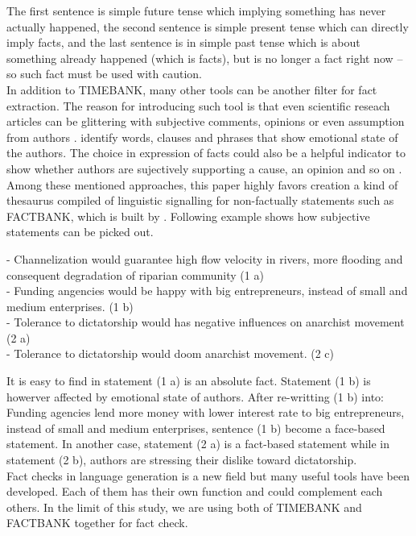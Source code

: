 The first sentence is simple future tense which implying something has never actually happened, the second sentence is simple present tense which can directly imply facts, and the last sentence is in simple past tense which is about something already happened (which is facts), but is no longer a fact right now -- so such fact must be used with caution. \\

In addition to TIMEBANK, many other tools can be another filter for fact extraction. The reason for introducing such tool is that even scientific reseach articles can be glittering with subjective comments, opinions or even assumption from authors \cite{schultze2000confessional}. \cite{dave2003mining} identify words, clauses and phrases that show emotional state of the authors. The choice in expression of facts could also be a helpful indicator to show whether authors are sujectively supporting a cause, an opinion and so on \cite{wiebe2005annotating}. Among these mentioned approaches, this paper highly favors creation a kind of thesaurus compiled of linguistic signalling for non-factually statements such as FACTBANK, which is built by \cite{sauri2009factbank}. Following example shows how subjective statements can be picked out.\\
\noindent
\begin{flushleft}
	-   Channelization would guarantee high flow velocity in rivers, more flooding and consequent degradation of riparian community (1 a)\\
	-	Funding angencies would be happy with big entrepreneurs, instead of small and medium enterprises. (1 b)\\
	-	Tolerance to dictatorship would has negative influences on anarchist movement (2 a)\\
	-	Tolerance to dictatorship would doom anarchist movement. (2 c)\\
\end{flushleft}

It is easy to find in statement (1 a) is an absolute fact. Statement (1 b) is howerver affected by emotional state of authors. After re-writting (1 b) into: Funding agencies lend more money with lower interest rate to big entrepreneurs, instead of small and medium enterprises, sentence (1 b) become a face-based statement. In another case, statement (2 a) is a fact-based statement while in statement (2 b), authors are stressing their dislike toward dictatorship.\\
Fact checks in language generation is a new field but many useful tools have been developed. Each of them has their own function and could complement each others. In the limit of this study, we are using both of TIMEBANK and FACTBANK together for fact check.\\

